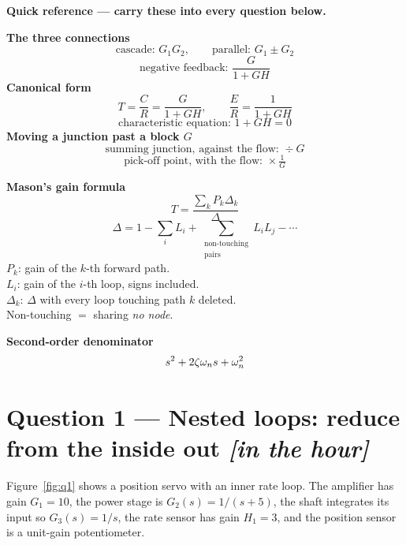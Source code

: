 \documentclass[11pt,a4paper]{article}
\newcommand{\inhour}{\hfill{\small\color{faccent}\itshape[in the hour]}}
\begin{document}
\begin{readingbox}
\textbf{Quick reference --- carry these into every question below.}

\smallskip
\begin{minipage}[t]{0.48\textwidth}
\textbf{The three connections}\\[2pt]
\footnotesize
\[
  \text{cascade: } G_1G_2,
  \qquad
  \text{parallel: } G_1\pm G_2
\]
\[
  \text{negative feedback: } \frac{G}{1+GH}
\]
\textbf{Canonical form}
\[
  T=\frac{C}{R}=\frac{G}{1+GH},
  \qquad
  \frac{E}{R}=\frac{1}{1+GH}
\]
\[
  \text{characteristic equation: } 1+GH=0
\]
\textbf{Moving a junction past a block $G$}
\[
  \text{summing junction, against the flow: } \div G
\]
\[
  \text{pick-off point, with the flow: } \times\tfrac{1}{G}
\]
\end{minipage}
\hfill
\begin{minipage}[t]{0.48\textwidth}
\textbf{Mason's gain formula}\\[2pt]
\footnotesize
\[
  T = \frac{\sum_k P_k\Delta_k}{\Delta}
\]
\[
  \Delta = 1-\sum_i L_i
    + \!\!\sum_{\substack{\text{non-touching}\\ \text{pairs}}}\!\! L_iL_j
    - \cdots
\]
$P_k$: gain of the $k$-th forward path.\\
$L_i$: gain of the $i$-th loop, signs included.\\
$\Delta_k$: $\Delta$ with every loop touching path $k$ deleted.\\
Non-touching $=$ sharing \emph{no node}.

\medskip
\textbf{Second-order denominator}
\[
  s^{2}+2\zeta\omega_{n} s+\omega_{n}^{2}
\]
\end{minipage}
\end{readingbox}

\section*{Question 1 --- Nested loops: reduce from the inside out \inhour}

Figure~\ref{fig:q1} shows a position servo with an inner rate loop. The
amplifier has gain $G_1=10$, the power stage is $G_2(s)=1/(s+5)$, the shaft
integrates its input so $G_3(s)=1/s$, the rate sensor has gain $H_1=3$, and the
position sensor is a unit-gain potentiometer.
\end{document}
